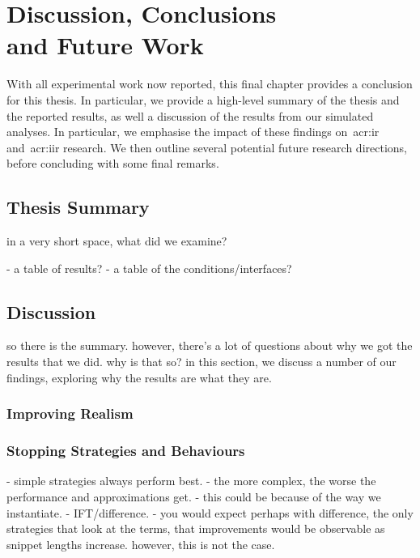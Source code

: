 
\chapter[Discussion, Conclusions and Future Work]{Discussion, Conclusions\\and Future Work}\label{chap:conclusions}
With all experimental work now reported, this final chapter provides a conclusion for this thesis. In particular, we provide a high-level summary of the thesis and the reported results, as well a discussion of the results from our simulated analyses. In particular, we emphasise the impact of these findings on~\gls{acr:ir} and~\gls{acr:iir} research. We then outline several potential future research directions, before concluding with some final remarks.

\section{Thesis Summary}
in a very short space, what did we examine?

- a table of results?
- a table of the conditions/interfaces?

\section{Discussion}
so there is the summary.
however, there's a lot of questions about why we got the results that we did.
why is that so?
in this section, we discuss a number of our findings, exploring why the results are what they are.

\subsection{Improving Realism}

\subsection{Stopping Strategies and Behaviours}

- simple strategies always perform best.
- the more complex, the worse the performance and approximations get.
    - this could be because of the way we instantiate.
    - IFT/difference.
        - you would expect perhaps with difference, the only strategies that look at the terms, that improvements would be observable as snippet lengths increase. however, this is not the case.

